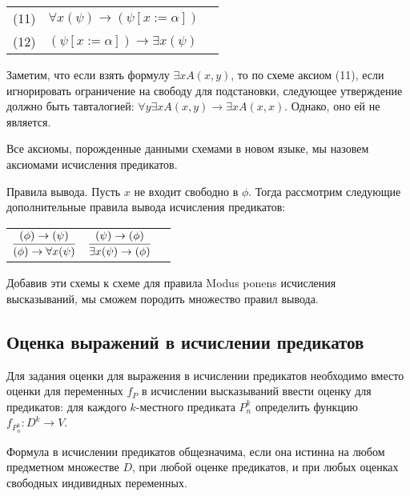 \begin{tabular}{lll}
(11) & $\forall{x}(\psi) \rightarrow (\psi[x := \alpha])$\\ 
(12) & $(\psi[x := \alpha]) \rightarrow \exists{x}(\psi)$
\end{tabular}

Заметим, что если взять формулу $\exists x A(x,y)$, то по схеме аксиом (11),
если игнорировать ограничение на свободу для подстановки, 
следующее утверждение должно быть тавталогией: 
$\forall y \exists x A(x,y) \rightarrow \exists x A (x,x)$. Однако, оно ей не является.

Все аксиомы, порожденные данными схемами в новом языке, мы назовем аксиомами исчисления
предикатов.

Правила вывода.
Пусть $x$ не входит свободно в $\phi$. Тогда рассмотрим следующие дополнительные
правила вывода исчисления предикатов:

\begin{tabular}{lll}
$\infer{(\phi) \rightarrow \forall{x}(\psi)}{(\phi) \rightarrow (\psi)}$ &
$\infer{\exists{x}(\psi) \rightarrow (\phi)}{(\psi) \rightarrow (\phi)}$
\end{tabular}

Добавив эти схемы к схеме для правила Modus ponens исчисления высказываний,
мы сможем породить множество правил вывода.


\subsection{Оценка выражений в исчислении предикатов}

Для задания оценки для выражения в исчислении предикатов необходимо
вместо оценки для переменных $f_P$ в исчислении высказываний ввести
оценку для предикатов: для каждого $k$-местного предиката $P^k_n$ определить
функцию $f_{P^k_n}: D^k \rightarrow V$.

\begin{definition}Формула в исчислении предикатов общезначима, если она 
истинна на любом предметном множестве $D$, 
при любой оценке предикатов, и при любых оценках свободных индивидных 
переменных.
\end{definition}

